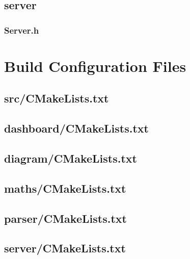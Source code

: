 \section{server}

\subsection{Server.h}


\chapter{Build Configuration Files}

\section{src/CMakeLists.txt}


\section{dashboard/CMakeLists.txt}


\section{diagram/CMakeLists.txt}


\section{maths/CMakeLists.txt}


\section{parser/CMakeLists.txt}


\section{server/CMakeLists.txt}


